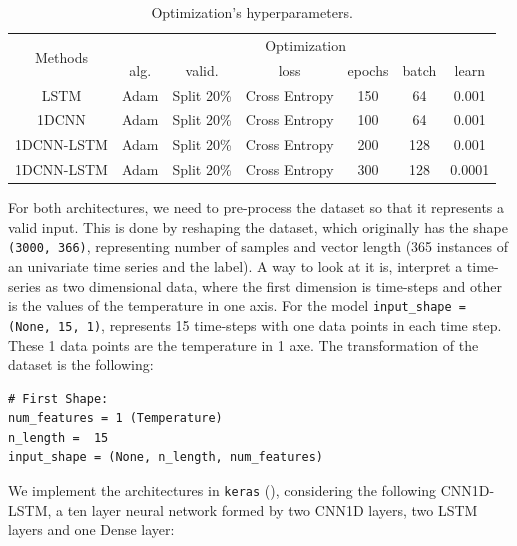 \begin{table}[h]
	\centering
	\tiny
	\begin{tabular}{|c|c|c|c|c|c|c|}
		\hline
		\multirow{2}{*}{Methods} & \multicolumn{6}{c|}{Optimization} \\
		\cline{2-7}
		& alg. & valid. & loss & epochs & batch & learn \\
		\cline{2-7}
		\hline
		LSTM & Adam & Split 20\% & Cross Entropy & 150 & 64 & 0.001 \\
		\hline
		1DCNN & Adam & Split 20\% & Cross Entropy & 100 & 64 & 0.001 \\
		\hline
		1DCNN-LSTM & Adam & Split 20\% & Cross Entropy & 200 & 128 & 0.001 \\
		\hline
		1DCNN-LSTM & Adam & Split 20\% & Cross Entropy & 300 & 128 & 0.0001 \\
		\hline
	\end{tabular}
	\caption{Optimization’s hyperparameters.}
	\label{Table:OptimizationNN}
\end{table}

For both architectures, we need to pre-process the dataset so that it represents a valid input. This is done by reshaping the dataset, which originally has the shape \texttt{(3000, 366)}, representing number of samples and vector length (365 instances of an univariate time series and the label). A way to look at it is, interpret a time-series as two dimensional data, where the first dimension is time-steps and other is the values of the  temperature in one axis. For the model \texttt{input\_shape = (None, 15, 1)}, represents 15 time-steps with one data points in each time step. These 1 data points are the temperature in 1 axe. The transformation of the dataset is the following:

\lstset{language=Python}
\lstset{frame=lines}
\lstset{basicstyle=\footnotesize}
\begin{lstlisting}
# First Shape:
num_features = 1 (Temperature)
n_length =  15
input_shape = (None, n_length, num_features)
\end{lstlisting}

We implement the architectures in \texttt{keras} (\cite{Chollet2015}),  considering the following CNN1D-LSTM, a ten layer neural network formed by two CNN1D layers, two LSTM layers and one Dense layer:

